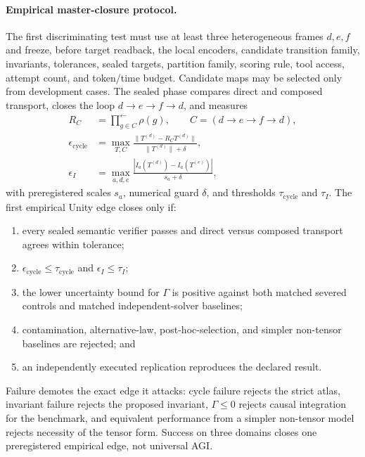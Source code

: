 \documentclass[10pt,twocolumn]{article}
\theoremstyle{definition}
\theoremstyle{plain}
\theoremstyle{remark}
\begin{document}
\paragraph{Empirical master-closure protocol.}
The first discriminating test must use at least three heterogeneous frames $d,e,f$ and freeze, before target readback, the local encoders, candidate transition family, invariants, tolerances, sealed targets, partition family, scoring rule, tool access, attempt count, and token/time budget.  Candidate maps may be selected only from development cases.  The sealed phase compares direct and composed transport, closes the loop $d\to e\to f\to d$, and measures
\begin{align}
R_C&=\prod_{g\in C}^{\leftarrow}\rho(g),\qquad
C=(d\to e\to f\to d),\\
\epsilon_{\mathrm{cycle}}
&=\max_{T,C}\frac{\|T^{(d)}-R_C T^{(d)}\|}
{\|T^{(d)}\|+\delta},\\
\epsilon_I
&=\max_{a,d,e}
\frac{|I_a(T^{(d)})-I_a(T^{(e)})|}{s_a+\delta},
\label{eq:unity-empirical-residuals}
\end{align}
with preregistered scales $s_a$, numerical guard $\delta$, and thresholds $\tau_{\mathrm{cycle}}$ and $\tau_I$.  The first empirical Unity edge closes only if:
\begin{enumerate}
  \item every sealed semantic verifier passes and direct versus composed transport agrees within tolerance;
  \item $\epsilon_{\mathrm{cycle}}\leq\tau_{\mathrm{cycle}}$ and $\epsilon_I\leq\tau_I$;
  \item the lower uncertainty bound for $\Gamma$ is positive against both matched severed controls and matched independent-solver baselines;
  \item contamination, alternative-law, post-hoc-selection, and simpler non-tensor baselines are rejected; and
  \item an independently executed replication reproduces the declared result.
\end{enumerate}
Failure demotes the exact edge it attacks: cycle failure rejects the strict atlas, invariant failure rejects the proposed invariant, $\Gamma\leq0$ rejects causal integration for the benchmark, and equivalent performance from a simpler non-tensor model rejects necessity of the tensor form.  Success on three domains closes one preregistered empirical edge, not universal AGI.
\end{document}
